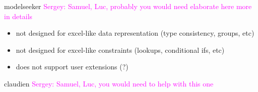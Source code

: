\documentclass{ecai}
\newcommand{\sergey}[1]{\textcolor{magenta}{{\sc Sergey:} #1}\xspace}
\begin{document}
modelseeker \cite{modelseeker} \sergey{Samuel, Luc, probably you would need elaborate here more in details}

\begin{itemize}
  \item not designed for excel-like data representation (type consistency, groups, etc)
  \item not designed for excel-like constraints (lookups, conditional ifs, etc)
  \item does not support user extensions (?)
\end{itemize}

claudien \cite{claudien} \sergey{Samuel, Luc, you would need to help with this one}



\end{document}
